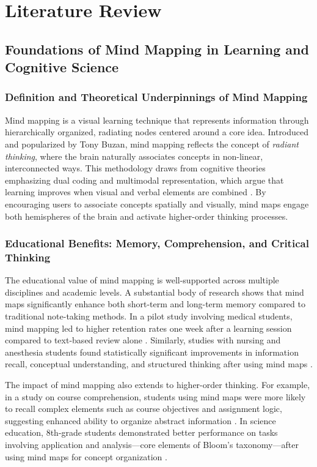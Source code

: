 \documentclass{CPP}
\begin{document}
\newpage

\chapter{Literature Review}

\section{Foundations of Mind Mapping in Learning and Cognitive Science}

\subsection{Definition and Theoretical Underpinnings of Mind Mapping}

Mind mapping is a visual learning technique that represents information through hierarchically organized, radiating nodes centered around a core idea. Introduced and popularized by Tony Buzan, mind mapping reflects the concept of \textit{radiant thinking}, where the brain naturally associates concepts in non-linear, interconnected ways. This methodology draws from cognitive theories emphasizing dual coding and multimodal representation, which argue that learning improves when visual and verbal elements are combined \citep{Sajadi2023, McCrea2018}. By encouraging users to associate concepts spatially and visually, mind maps engage both hemispheres of the brain and activate higher-order thinking processes.

\subsection{Educational Benefits: Memory, Comprehension, and Critical Thinking}

The educational value of mind mapping is well-supported across multiple disciplines and academic levels. A substantial body of research shows that mind maps significantly enhance both short-term and long-term memory compared to traditional note-taking methods. In a pilot study involving medical students, mind mapping led to higher retention rates one week after a learning session compared to text-based review alone \citep{Kalyanasundaram2017}. Similarly, studies with nursing and anesthesia students found statistically significant improvements in information recall, conceptual understanding, and structured thinking after using mind maps \citep{Sajadi2023, Deka2019}.

The impact of mind mapping also extends to higher-order thinking. For example, in a study on course comprehension, students using mind maps were more likely to recall complex elements such as course objectives and assignment logic, suggesting enhanced ability to organize abstract information \citep{McCrea2018}. In science education, 8th-grade students demonstrated better performance on tasks involving application and analysis—core elements of Bloom’s taxonomy—after using mind maps for concept organization \citep{Munir2023}.
\end{document}
